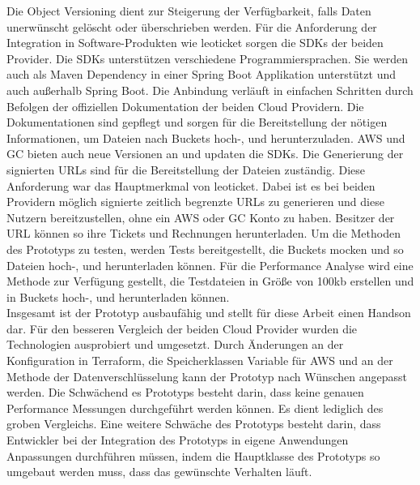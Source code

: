 Die Object Versioning dient zur Steigerung der Verfügbarkeit, falls Daten unerwünscht gelöscht oder überschrieben werden. Für die Anforderung der Integration in Software-Produkten wie leoticket sorgen die SDKs der beiden Provider. Die SDKs unterstützen verschiedene Programmiersprachen. Sie werden auch als Maven Dependency in einer Spring Boot Applikation unterstützt und auch außerhalb Spring Boot. Die Anbindung verläuft in einfachen Schritten durch Befolgen der offiziellen Dokumentation der beiden Cloud Providern. Die Dokumentationen sind gepflegt und sorgen für die Bereitstellung der nötigen Informationen, um Dateien nach Buckets hoch-, und herunterzuladen. AWS und GC bieten auch neue Versionen an und updaten die SDKs. Die Generierung der signierten URLs sind für die Bereitstellung der Dateien zuständig. Diese Anforderung war das Hauptmerkmal von leoticket. Dabei ist es bei beiden Providern möglich signierte zeitlich begrenzte URLs zu generieren und diese Nutzern bereitzustellen, ohne ein AWS oder GC Konto zu haben. Besitzer der URL können so ihre Tickets und Rechnungen herunterladen. Um die Methoden des Prototyps zu testen, werden Tests bereitgestellt, die Buckets mocken und so Dateien hoch-, und herunterladen können. Für die Performance Analyse wird eine Methode zur Verfügung gestellt, die Testdateien in Größe von 100kb erstellen und in Buckets hoch-, und herunterladen können.\\

Insgesamt ist der Prototyp ausbaufähig und stellt für diese Arbeit einen Handson dar. Für den besseren Vergleich der beiden Cloud Provider wurden die Technologien ausprobiert und umgesetzt. Durch Änderungen an der Konfiguration in Terraform, die Speicherklassen Variable für AWS und an der Methode der Datenverschlüsselung kann der Prototyp nach Wünschen angepasst werden. Die Schwächend es Prototyps besteht darin, dass keine genauen Performance Messungen durchgeführt werden können. Es dient lediglich des groben Vergleichs. Eine weitere Schwäche des Prototyps besteht darin, dass Entwickler bei der Integration des Prototyps in eigene Anwendungen Anpassungen durchführen müssen, indem die Hauptklasse des Prototyps so umgebaut werden muss, dass das gewünschte Verhalten läuft.












